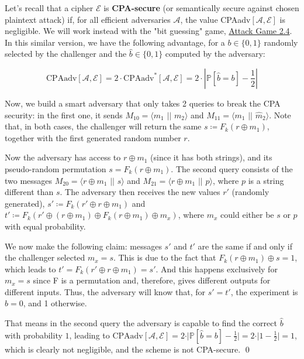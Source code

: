 Let's recall that a cipher $\mathcal{E}$ is \textbf{CPA-secure} (or semantically secure against chosen plaintext attack) if, for all efficient adversaries $\mathcal{A}$, the value CPAadv$[\mathcal{A}, \mathcal{E}]$ is negligible.
We will work instead with the "bit guessing" game, \hyperref[ag:2-4]{Attack Game 2.4}.
In this similar version, we have the following advantage, for a $b \in \{0, 1\}$ randomly selected by the challenger and the $\hat b \in \{0, 1\}$ computed by the adversary:

\begin{equation*}
    \text{CPAadv}[\mathcal{A}, \mathcal{E}] = 2 \cdot \text{CPAadv}^{*}[\mathcal{A}, \mathcal{E}] = 2 \cdot \left| \mathbb{P}[\hat{b} = b] - \frac{1}{2} \right|
\end{equation*}

Now, we build a smart adversary that only takes 2 queries to break the CPA security: in the first one, it sends $M_{10} = \langle m_1$ $\vert \vert$ $m_2 \rangle$ and $M_{11} = \langle m_1$ $\vert \vert$ $\hat m_2 \rangle$.
Note that, in both cases, the challenger will return the same $s \coloneqq F_k (r \oplus m_1)$, together with the first generated random number $r$.

Now the adversary has access to $r \oplus m_1$ (since it has both strings), and its pseudo-random permutation $s = F_k (r \oplus m_1)$.
The second query consists of the two messages $M_{20} = \langle r \oplus m_1$ $\vert \vert$ $s \rangle$ and $M_{21} = \langle r \oplus m_1$ $\vert \vert$ $p \rangle$, where $p$ is a string different than $s$.
The adversary then receives the new values $r'$ (randomly generated), $s' \coloneqq F_k(r' \oplus r \oplus m_1)$ and $t' \coloneqq F_k(r' \oplus (r \oplus m_1) \oplus F_k (r \oplus m_1) \oplus m_x)$, where $m_x$ could either be $s$ or $p$ with equal probability.

We now make the following claim: messages $s'$ and $t'$ are the same if and only if the challenger selected $m_x = s$.
This is due to the fact that $F_k(r \oplus m_1) \oplus s = 1$, which leads to $t' = F_k(r' \oplus r \oplus m_1) = s'$.
And this happens exclusively for $m_x = s$ since F is a permutation and, therefore, gives different outputs for different inputs.
Thus, the adversary will know that, for $s' = t'$, the experiment is $\hat{b} = 0$, and 1 otherwise.

That means in the second query the adversary is capable to find the correct $\hat b$ with probability $1$, leading to $\text{CPAadv}[\mathcal{A}, \mathcal{E}] = 2 \cdot \vert \mathbb{P}[\hat{b} = b] - \frac{1}{2} \vert = 2 \cdot \vert 1 - \frac{1}{2} \vert = 1$, which is clearly not negligible, and the scheme is not CPA-secure. \hfill \qed

